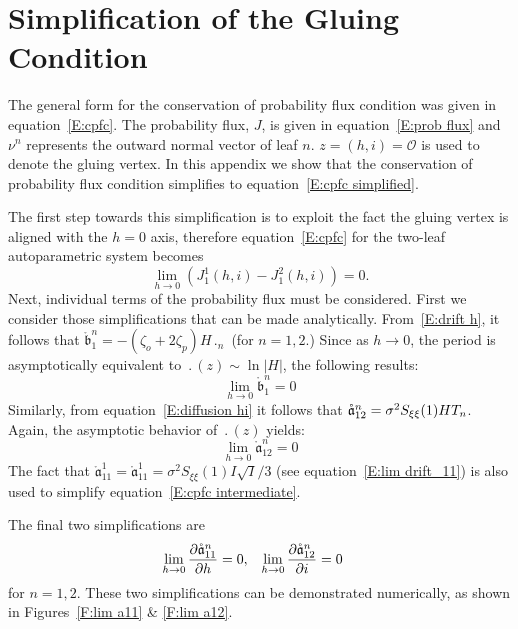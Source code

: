 \section{Simplification of the Gluing Condition}
\label{A:gluing BC simplification}

The general form for the conservation of probability flux condition was given in equation~\eqref{E:cpfc}. The probability flux, $J$, is given in equation~\eqref{E:prob flux} and $\nu^n$ represents the outward normal vector of leaf $n$. $z = (h,i) = \mathcal{O}$ is used to denote the gluing vertex. In this appendix we show that the conservation of probability flux condition simplifies to equation~\eqref{E:cpfc simplified}.

The first step towards this simplification is to exploit the fact the gluing vertex is aligned with the $h=0$ axis, therefore equation~\eqref{E:cpfc} for the two-leaf autoparametric system becomes
\begin{equation}
\lim_{h \to 0} \left(J^1_1(h,i) - J^2_1(h,i)\right) = 0.
\label{E:cpfc intermediate}
\end{equation}
Next, individual terms of the probability flux must be considered. First we consider those simplifications that can be made analytically. From~\eqref{E:drift h}, it follows that $\mathring{\mathfrak{b}}_1^n = - (\zeta_o + 2\zeta_p) H \period_n$ (for $n=1,2$.) Since as $h \to 0$, the period is asymptotically equivalent to $\period(z) \sim \ln |H|$, the following results:
\[
\lim_{h \to 0} \mathring{\mathfrak{b}}_1^n = 0
\]
Similarly, from equation~\eqref{E:diffusion hi} it follows that $\mathring{\mathfrak a}_{12}^n = \sigma^2 S_{\xi\xi}(1) H T_n$. Again, the asymptotic behavior of $\period(z)$ yields:
\[
\lim_{h \to 0} \mathring{\mathfrak{a}}_{12}^n = 0
\]
The fact that $\mathring{\mathfrak{a}}_{11}^1 = \mathring{\mathfrak{a}}_{11}^1 = \sigma^2 S_{\xi\xi}(1) I \sqrt{I}/3$ (see equation~\eqref{E:lim drift_11}) is also used to simplify equation~\eqref{E:cpfc intermediate}.

The final two simplifications are
\begin{align*}
\lim_{h \to 0} \frac{\partial \mathring{\mathfrak a}_{11}^n}{\partial h} &= 0,&
\lim_{h \to 0} \frac{\partial \mathring{\mathfrak a}_{12}^n}{\partial i} &= 0
\end{align*}
for $n=1,2$. These two simplifications can be demonstrated numerically, as shown in Figures~\ref{F:lim a11} \& \ref{F:lim a12}.

